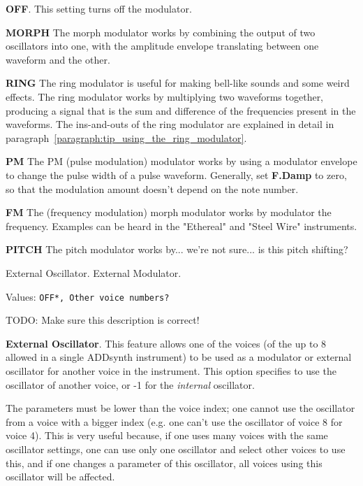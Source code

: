    \begin{enumber}
      \item \textbf{OFF}.
      This setting turns off the modulator.
      \item \textbf{MORPH}
      The morph modulator works by combining the output of two oscillators
      into one, with the amplitude envelope translating between one waveform
      and the other.
      \item \textbf{RING}
      The ring modulator is useful for making bell-like sounds and some weird
      effects.  The ring modulator works by multiplying two waveforms
      together, producing a signal that is the sum and difference of the
      frequencies present in the waveforms.  The ins-and-outs of the ring
      modulator are explained in detail in
      paragraph~\ref{paragraph:tip_using_the_ring_modulator}.
      \item \textbf{PM}
      The PM (pulse modulation) modulator works by using a modulator
      envelope to change the pulse width of a pulse waveform.
      Generally, set \textbf{F.Damp} to zero, so that the modulation amount
      doesn't depend on the note number.
      \item \textbf{FM}
      The (frequency modulation) morph modulator works by modulator the
      frequency.  Examples can be heard in the "Ethereal" and "Steel Wire"
      instruments.
      \item \textbf{PITCH}
      The pitch modulator works by...
      we're not sure... is this pitch shifting?
   \end{enumber}

   External Oscillator.
   External Modulator.

   Values: \texttt{OFF*, Other voice numbers?}

   TODO: Make sure this description is correct!

   \textbf{External Oscillator}.
   This feature allows one of the voices (of the up to 8 allowed in a single
   ADDsynth instrument) to be used as a modulator or external oscillator for
   another voice in the instrument.
   This option specifies to use the oscillator of another voice, or
   -1 for the \textsl{internal} oscillator.

   The parameters must be lower than the voice index; one cannot use the
   oscillator from a voice with a bigger index (e.g. one can't use the
   oscillator of voice 8 for voice 4). This is very useful because, if
   one uses many voices with the same oscillator settings, one can use only
   one oscillator and select other voices to use this, and if one changes a
   parameter of this oscillator, all voices using this oscillator will be
   affected.

